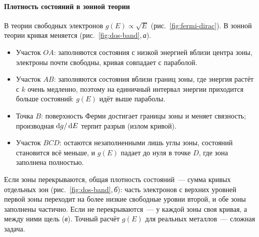 \paragraph{Плотность состояний в зонной теории}
В теории свободных электронов $g(E)\propto\sqrt E$ (рис.~\ref{fig:fermi-dirac}).
В зонной теории кривая меняется (рис.~\ref{fig:dos-band},\,\textit{а}).
\begin{itemize}
\item Участок $OA$: заполняются состояния с низкой энергией вблизи
центра зоны, электроны почти свободны, кривая совпадает с параболой.
\item Участок $AB$: заполняются состояния вблизи границ зоны, где
энергия растёт с $k$ очень медленно, поэтому на единичный интервал
энергии приходится больше состояний: $g(E)$ идёт выше параболы.
\item Точка $B$: поверхность Ферми достигает границы зоны и меняет
связность; производная $\mathop{}\!\mathrm{d} g/\mathop{}\!\mathrm{d} E$ терпит разрыв (излом кривой).
\item Участок $BCD$: остаются незаполненными лишь углы зоны,
состояний становится всё меньше, и $g(E)$ падает до нуля в точке $D$,
где зона заполнена полностью.
\end{itemize}
Если зоны перекрываются, общая плотность состояний~— сумма кривых
отдельных зон (рис.~\ref{fig:dos-band},\,\textit{б}): часть электронов с
верхних уровней первой зоны переходит на более низкие свободные уровни
второй, и обе зоны заполнены частично. Если не перекрываются~— у каждой
зоны своя кривая, а между ними щель (\textit{в}). Точный расчёт $g(E)$
для реальных металлов~— сложная задача.

